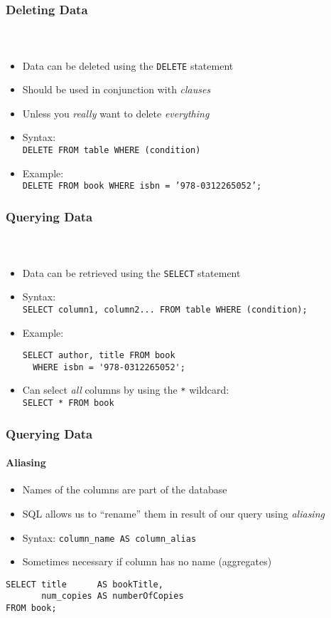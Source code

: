 \documentclass{beamer}
\begin{document}
\begin{frame}[fragile]
  \frametitle{Deleting Data}
  \framesubtitle{~}

\begin{itemize}
  \item Data can be deleted using the \texttt{DELETE} statement
  \item Should be used in conjunction with \emph{clauses}
  \item Unless you \emph{really} want to delete \emph{everything}
  \item Syntax:\\
	\texttt{DELETE FROM table WHERE (condition)}
  \item Example: \\
	\texttt{DELETE FROM book WHERE isbn = '978-0312265052';}
\end{itemize}

\end{frame}

\begin{frame}[fragile]
  \frametitle{Querying Data}
  \framesubtitle{~}

\begin{itemize}
  \item Data can be retrieved using the \texttt{SELECT} statement
  \item Syntax:\\
	\texttt{SELECT column1, column2... FROM table WHERE (condition);}
  \item Example:\\
\begin{verbatim}
SELECT author, title FROM book 
  WHERE isbn = '978-0312265052';
\end{verbatim}
  \item Can select \emph{all} columns by using the \texttt{*} wildcard:\\
	\texttt{SELECT * FROM book}
\end{itemize}

\end{frame}

\begin{frame}[fragile]
  \frametitle{Querying Data}
  \framesubtitle{Aliasing}

\begin{itemize}
  \item Names of the columns are part of the database
  \item SQL allows us to ``rename'' them in result of our query using \emph{aliasing}
  \item Syntax: \texttt{column_name AS column_alias}
  \item Sometimes necessary if column has no name (aggregates)
\end{itemize}

\begin{verbatim}
SELECT title      AS bookTitle,
       num_copies AS numberOfCopies
FROM book;
\end{verbatim}

\end{frame}
\end{document}
